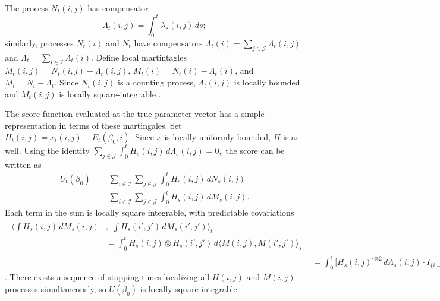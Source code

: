 \documentclass[aoas,preprint]{imsart}
\begin{document}
The process $N_t(i,j)$ has compensator
\begin{equation}
    \Lambda_t(i,j)
        =
            \int_0^t \lambda_s(i,j) \, ds;
\end{equation}
similarly, processes $N_t(i)$ and $N_t$ have compensators
$\Lambda_t(i) = \sum_{j \in \mathcal{J}} \Lambda_t(i,j)$
and $\Lambda_t = \sum_{i \in \mathcal{I}} \Lambda_t(i)$.  Define local
martintagles $M_t(i,j) = N_t(i,j) - \Lambda_t(i,j)$,
$M_t(i) = N_t(i) - \Lambda_t(i)$, and 
$M_t = N_t - \Lambda_t$.  Since $N_t(i,j)$ is a counting process,
$\Lambda_t(i,j)$ is locally bounded 
\cite[Thm.~IV.12]{meyer1976cours}
and $M_t(i,j)$ is locally square-integrable
\cite[Thm.~2.3.1]{fleming1991counting}.

The score function evaluated at the true parameter vector has a simple
representation in terms of these martingales.  Set
$H_t(i,j) = x_t(i,j) - E_t(\beta_0,i)$.  Since $x$ is locally uniformly
bounded, $H$ is as well.  Using the identity
\(
    \sum_{j \in \mathcal{J}}
    \int_0^t
        H_s(i,j) \,
        d\Lambda_s(i,j)
    =
    0,
\)
the score can be written as
\begin{align*}
    U_t(\beta_0)
        &=
        \sum_{i \in \mathcal{I}}
        \sum_{j \in \mathcal{J}}
        \int_0^t
            H_s(i,j) \, dN_s(i,j) \\
        &=
        \sum_{i \in \mathcal{I}}
        \sum_{j \in \mathcal{J}}
        \int_0^t
            H_s(i,j) \, dM_s(i,j).
\end{align*}
Each term in the sum is locally square integrable, with predictable
covariations
\begin{align*}
    \begin{split}
        \bigg\langle
            \int
                H_s(i,j) \, dM_s(i,j)
        &, \, \,
            \int
                H_s(i',j') \, dM_s(i',j')
        \bigg\rangle_t \\
        &=
            \int_0^t
                H_s(i,j) \otimes H_s(i',j') \,
                d\big\langle M(i,j), M(i',j')\big\rangle_s
    \end{split} \\
        &=
            \int_0^t
                \big[ H_s(i,j) \big]^{\otimes 2} \,
                d\Lambda_s(i,j)
            \cdot
            I_{\{ i = i', j = j' \}}
\end{align*}
\cite[Thm.~2.4.3]{fleming1991counting}.  There exists a sequence
of stopping times localizing all $H(i,j)$ and $M(i,j)$ processes
simultaneously, so $U(\beta_0)$ is locally square integrable
\end{document}
